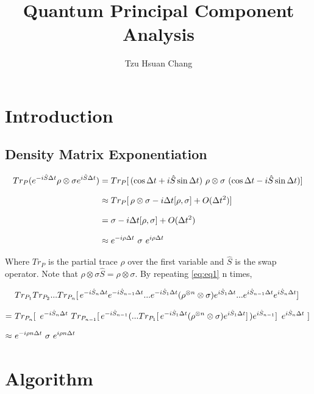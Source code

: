 \documentclass[a4paper]{article}
\title{Quantum Principal Component Analysis}
\author{Tzu Hsuan Chang}
\begin{document}
\maketitle

\section{Introduction}
\label{sec:Intro}

\subsection*{Density Matrix Exponentiation}
\label{subsubsec:dme}

\begin{equation} \label{eq:eq1}
\setlength{\jot}{10pt}
\begin{aligned}
	Tr_P ( e^{-i \hat{S} \Delta t} \rho  \otimes \sigma e^{i \hat{S} \Delta t} )
		&= Tr_P [ \, ( \cos \Delta t + i \hat{S} \sin \Delta t ) \ \rho \otimes \sigma \ ( \cos \Delta t - i \hat{S} \sin \Delta t ) ] \, \\
		&\approx Tr_P [ \, \rho \otimes \sigma - i \Delta t [\rho, \sigma] + O(\Delta t^2) ] \, \\
		&= \sigma - i \Delta t [\rho, \sigma] + O (\Delta t^2) \\
		&\approx e^{-i \rho \Delta t} \ \sigma \ e^{i \rho \Delta t}
\end{aligned}
\end{equation}


Where $Tr_P$ is the partial trace $\rho$ over the first variable and $\hat{S}$ is the swap operator. Note that $\rho \otimes \sigma \hat{S} = \rho \otimes \sigma$. By repeating \eqref{eq:eq1} n times,

\begin{equation} \label{eq:eq2}
\setlength{\jot}{10pt}
\begin{aligned}
	&Tr_{P_1} Tr_{P_2} ... Tr_{P_n} [ \, e^{-i \hat{S}_n \Delta t} e^{-i \hat{S}_{n-1} \Delta t} ... e^{-i \hat{S}_1 \Delta t} ( \rho^{\otimes n}  \otimes \sigma ) e^{i \hat{S}_1 \Delta t} ... e^{i \hat{S}_{n-1} \Delta t} e^{i \hat{S}_n \Delta t} ] \, \\
	= \ &Tr_{P_n} [ \, \ 
		e^{-i \hat{S}_n \Delta t} \ 
		Tr_{P_{n-1}} [\, 
			e^{-i \hat{S}_{n-1}}
			(... Tr_{P_1} [ \, e^{-i \hat{S}_1 \Delta t} ( \rho^{\otimes n}  \otimes \sigma ) e^{i \hat{S}_1 \Delta t} ] \,)  
			e^{i \hat{S}_{n-1}}
		] \, \
		e^{i \hat{S}_n \Delta t} \ 
	] \, \\
	\approx \ &e^{-i \rho n \Delta t} \ \sigma \ e^{i \rho n \Delta t}
\end{aligned}
\end{equation}


\section{Algorithm}
\end{document}
